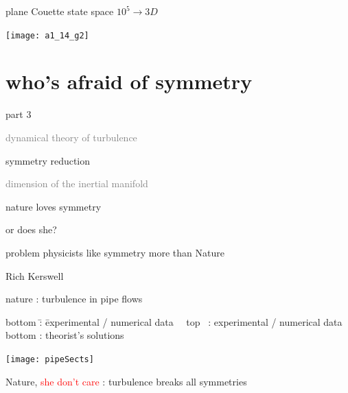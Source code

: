 \begin{frame}{plane Couette state space $10^5 \to 3D$}
\begin{center}
\texttt{[image: a1\_14\_g2]}
\end{center}
\end{frame}


\section[who's afraid of symmetry]{who's afraid of symmetry}

\begin{frame}{part 3}
\begin{enumerate}
              \item
    \textcolor{gray}{\small
dynamical theory of turbulence
              \item
\statesp
        }
              \item
    {\Large
symmetry reduction
    }\textcolor{gray}{\small
              \item
dimension of the inertial manifold
                    }
            \end{enumerate}
\end{frame}


\begin{frame}{}
\begin{block}{}
{\Huge
nature loves symmetry
}
\end{block}
or does she?

\bigskip\bigskip\bigskip

\begin{block}{\Large problem}
    {\large
physicists like symmetry more than Nature
    }

\bigskip

\hfill
Rich Kerswell
\end{block}
\end{frame}

\begin{frame}{nature : turbulence in pipe flows}
\begin{tabbing}
bottom \= : \= experimental / numerical data \kill
~~top~ \> : \> experimental / numerical data \\
bottom \> : \> theorist's solutions
\end{tabbing}
\begin{center}
  \texttt{[image: pipeSects]}
\end{center}

\bigskip
Nature, \textcolor{red}{she don't care} :
turbulence breaks all symmetries
\end{frame}

